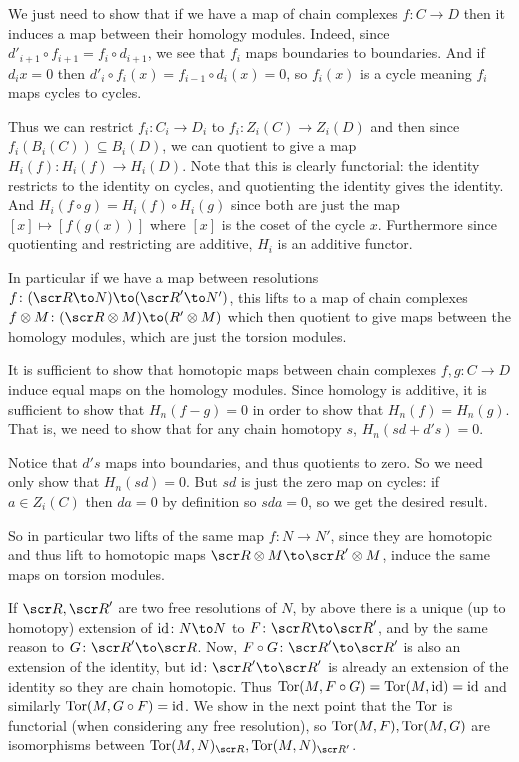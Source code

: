     \item We just need to show that if we have a map of chain complexes $f\colon C\to D$ then it induces a map
    between their homology modules.
    Indeed, since $d'_{i+1}\circ f_{i+1}=f_i\circ d_{i+1}$, we see that $f_i$ maps boundaries to boundaries.
    And if $d_ix=0$ then $d'_i\circ f_i(x)=f_{i-1}\circ d_i(x)=0$, so $f_i(x)$ is a cycle meaning $f_i$ maps cycles to cycles.

    Thus we can restrict $f_i\colon C_i\to D_i$ to $f_i\colon Z_i(C)\to Z_i(D)$ and then since $f_i(B_i(C))\subseteq B_i(D)$, we can
    quotient to give a map $H_i(f)\colon H_i(f)\to H_i(D)$.
    Note that this is clearly functorial: the identity restricts to the identity on cycles, and quotienting the identity gives the identity.
    And $H_i(f\circ g)=H_i(f)\circ H_i(g)$ since both are just the map $[x]\mapsto[f(g(x))]$ where $[x]$ is the coset of the cycle $x$.
    Furthermore since quotienting and restricting are additive, $H_i$ is an additive functor.

    In particular if we have a map between resolutions $f\colon(\R\to N)\to(\R'\to N')$, this lifts to a map of chain complexes
    $f\otimes M\colon(\R\otimes M)\to(R'\otimes M)$ which then quotient to give maps between the homology modules, which are just the torsion
    modules.

    \item It is sufficient to show that homotopic maps between chain complexes $f,g\colon C\to D$ induce equal maps on the homology modules.
    Since homology is additive, it is sufficient to show that $H_n(f-g)=0$ in order to show that $H_n(f)=H_n(g)$.
    That is, we need to show that for any chain homotopy $s$, $H_n(sd+d's)=0$.

    Notice that $d's$ maps into boundaries, and thus quotients to zero.
    So we need only show that $H_n(sd)=0$.
    But $sd$ is just the zero map on cycles: if $a\in Z_i(C)$ then $da=0$ by definition so $sda=0$, so we get the desired result.

    So in particular two lifts of the same map $f\colon N\to N'$, since they are homotopic and thus lift to homotopic maps $\R\otimes M\to\R'\otimes M$, induce
    the same maps on torsion modules.

    \item If $\R,\R'$ are two free resolutions of $N$, by above there is a unique (up to homotopy) extension of $\id\colon N\to N$ to $F\colon\R\to\R'$, and by the same
    reason to $G\colon\R'\to\R$.
    Now, $F\circ G\colon\R'\to\R'$ is also an extension of the identity, but $\id\colon\R'\to\R'$ is already an extension of the identity so they are chain homotopic.
    Thus ${\rm Tor}(M,F\circ G)={\rm Tor}(M,{\rm id})={\rm id}$ and similarly ${\rm Tor}(M,G\circ F)={\rm id}$.
    We show in the next point that the ${\rm Tor}$ is functorial (when considering any free resolution), so ${\rm Tor}(M,F),{\rm Tor}(M,G)$ are isomorphisms between $\tor(M,N)_\R,\tor(M,N)_{\R'}$.

